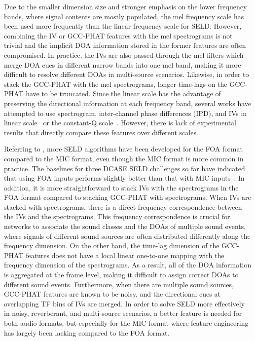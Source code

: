 \documentclass[journal]{IEEEtran}
\newcommand*{\gccphat}{\mbox{GCC-PHAT}\xspace}
\begin{document}
Due to the smaller dimension size and stronger emphasis on the lower frequency bands, where signal contents are mostly populated, the mel frequency scale has been used more frequently than the linear frequency scale for SELD. However, combining the IV or \gccphat features with the mel spectrograms is not trivial and the implicit DOA information stored in the former features are often compromised. In practice, the IVs are also passed through the mel filters which merge DOA cues in different narrow bands into one mel band, making it more difficult to resolve different DOAs in multi-source scenarios. Likewise, in order to stack the \gccphat with the mel spectrograms, longer time-lags on the \gccphat have to be truncated. Since the linear scale has the advantage of preserving the directional information at each frequency band, several works have attempted to use spectrogram, inter-channel phase differences (IPD), and IVs in linear scale~\cite{Shimada2021ACCDOA:Detection} or the constant-Q scale~\cite{Emmanuel2021Multi-scaleDetection}. However, there is lack of experimental results that directly compare these features over different scales. 

Referring to , more SELD algorithms have been developed for the FOA format compared to the MIC format, even though the MIC format is more common in practice. The baselines for three DCASE SELD challenges so far have indicated that using FOA inputs performs slightly better than that with MIC inputs~\cite{Adavanne2019ADetection, Politis2020ADetection, Politis2021}.  
In addition, it is more straightforward to stack IVs with the spectrograms in the FOA format compared to stacking \gccphat with spectrograms. 
When IVs are stacked with spectrograms, there is a direct frequency correspondence between the IVs and the spectrograms. This frequency correspondence is crucial for networks to associate the sound classes and the DOAs of multiple sound events, where signals of different sound sources are often distributed differently along the frequency dimension.
On the other hand, the time-lag dimension of the \gccphat features does not have a local linear one-to-one mapping with the frequency dimension of the spectrograms. As a result, all of the DOA information is aggregated at the frame level, making it difficult to assign correct DOAs to different sound events. Furthermore, when there are multiple sound sources, \gccphat features are known to be noisy, and the directional cues at overlapping TF bins of IVs are merged.
In order to solve SELD more effectively in noisy, reverberant, and multi-source scenarios, a better feature is needed for both audio formats, but especially for the MIC format where feature engineering has largely been lacking compared to the FOA format.
\end{document}
